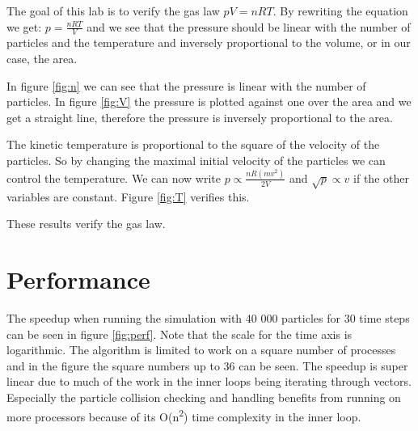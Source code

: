 \documentclass[a4paper, 12pt]{article}
\begin{document}
The goal of this lab is to verify the gas law $pV = nRT$.
By rewriting the equation we get: $p = \frac{nRT}{V}$ and we see that the
pressure should be linear with the number of particles and the temperature and
inversely proportional to the volume, or in our case, the area.

In figure \ref{fig:n} we can see that the pressure is linear with the number of
particles. In figure \ref{fig:V} the pressure is plotted against one over the
area and we get a straight line, therefore the pressure is inversely
proportional to the area.

The kinetic temperature is proportional to the square of the velocity of the
particles. So by changing the maximal initial velocity of the particles we can
control the temperature. We can now write $p \propto \frac{nR(mv^2)}{2V}$ and
$\sqrt{p} \propto v$ if the other variables are constant. Figure \ref{fig:T}
verifies this.

These results verify the gas law.

\section{Performance}
The speedup when running the simulation with 40 000 particles for 30 time
steps can be seen in figure \ref{fig:perf}. Note that the scale for the time
axis is logarithmic. The algorithm is limited to work on a square
number of processes and in the figure the square numbers up to 36 can be seen.
The speedup is super linear due to much of the work in the inner loops being 
iterating through vectors. Especially the particle collision checking and
handling benefits from running on more processors because of its
O(n\textsuperscript{2}) time complexity in the inner loop. 
\end{document}
